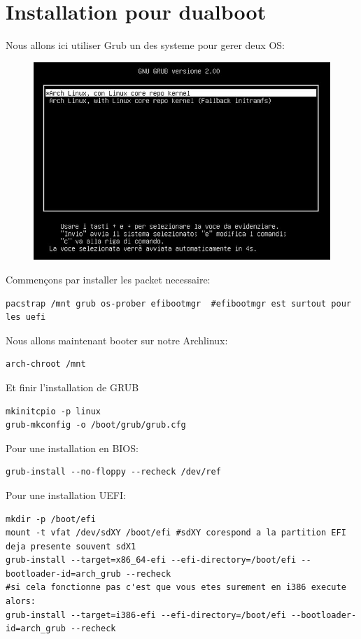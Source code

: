 \documentclass[a4paper]{book}
\begin{document}
\section{Installation pour dualboot}
Nous allons ici utiliser Grub un des systeme pour gerer deux OS\@:\\
\begin{figure}[h]
  \includegraphics[width=\textwidth]{images/grub}
\end{figure}
Commençons par installer les packet necessaire\@:\\
\begin{lstlisting}
pacstrap /mnt grub os-prober efibootmgr  #efibootmgr est surtout pour les uefi
\end{lstlisting}
Nous allons maintenant booter sur notre Archlinux\@:\\
\begin{lstlisting}
arch-chroot /mnt
\end{lstlisting}
Et finir l'installation de GRUB\\
\begin{lstlisting}
mkinitcpio -p linux
grub-mkconfig -o /boot/grub/grub.cfg
\end{lstlisting}
Pour une installation en BIOS\@:\\
\begin{lstlisting}
grub-install --no-floppy --recheck /dev/ref
\end{lstlisting}
Pour une installation UEFI\@:\\
\begin{lstlisting}
mkdir -p /boot/efi
mount -t vfat /dev/sdXY /boot/efi #sdXY corespond a la partition EFI deja presente souvent sdX1
grub-install --target=x86_64-efi --efi-directory=/boot/efi --bootloader-id=arch_grub --recheck
#si cela fonctionne pas c'est que vous etes surement en i386 execute alors:
grub-install --target=i386-efi --efi-directory=/boot/efi --bootloader-id=arch_grub --recheck
\end{lstlisting}
\end{document}
